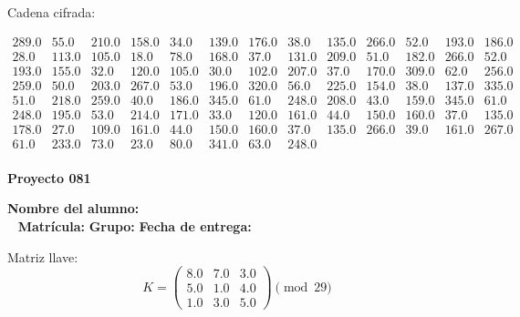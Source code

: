 \documentclass[12pt]{article}
\begin{document}
Cadena cifrada:
\begin{center}
$\begin{array}{lllllllllllll}
289.0 & 55.0 & 210.0 & 158.0 & 34.0 & 139.0 & 176.0 & 38.0 & 135.0 & 266.0 & 52.0 & 193.0 & 186.0\\
28.0 & 113.0 & 105.0 & 18.0 & 78.0 & 168.0 & 37.0 & 131.0 & 209.0 & 51.0 & 182.0 & 266.0 & 52.0\\
193.0 & 155.0 & 32.0 & 120.0 & 105.0 & 30.0 & 102.0 & 207.0 & 37.0 & 170.0 & 309.0 & 62.0 & 256.0\\
259.0 & 50.0 & 203.0 & 267.0 & 53.0 & 196.0 & 320.0 & 56.0 & 225.0 & 154.0 & 38.0 & 137.0 & 335.0\\
51.0 & 218.0 & 259.0 & 40.0 & 186.0 & 345.0 & 61.0 & 248.0 & 208.0 & 43.0 & 159.0 & 345.0 & 61.0\\
248.0 & 195.0 & 53.0 & 214.0 & 171.0 & 33.0 & 120.0 & 161.0 & 44.0 & 150.0 & 160.0 & 37.0 & 135.0\\
178.0 & 27.0 & 109.0 & 161.0 & 44.0 & 150.0 & 160.0 & 37.0 & 135.0 & 266.0 & 39.0 & 161.0 & 267.0\\
61.0 & 233.0 & 73.0 & 23.0 & 80.0 & 341.0 & 63.0 & 248.0\\
\end{array}$
\end{center}

\newpage


\textbf{Proyecto 081}

\textbf{Nombre del alumno:} \underline{\hspace{13cm}}\\\
\vspace{1cm}
\textbf{Matrícula:} \underline{\hspace{4cm}} \hspace{1cm}
\textbf{Grupo:} \underline{\hspace{2cm}}
\textbf{Fecha de entrega:} \underline{\hspace{2cm}}

\medskip

Matriz llave:
\[
K = \begin{pmatrix}
8.0 & 7.0 & 3.0\\
5.0 & 1.0 & 4.0\\
1.0 & 3.0 & 5.0
\end{pmatrix} \pmod{29}
\]
\end{document}
